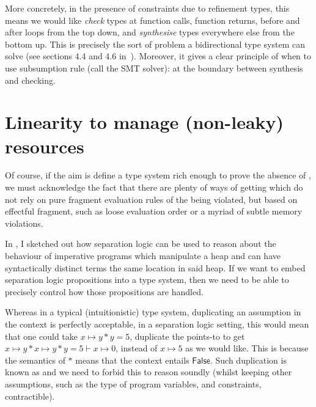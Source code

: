 More concretely, in the presence of constraints due to refinement types, this
means we would like \emph{check} types at function calls, function returns,
before and after loops from the top down, and \emph{synthesise} types
everywhere else from the bottom up. This is precisely the sort of problem a
bidirectional type system can solve (see sections 4.4 and 4.6
in~). Moreover, it gives a clear principle of
when to use subsumption rule (call the SMT solver): at the boundary between
synthesis and checking.

\section{Linearity to manage (non-leaky) resources}

Of course, if the aim is define a type system rich enough to prove the absence
of , we must acknowledge the fact that there are plenty of ways of
getting  which do not rely on pure fragment evaluation rules of the
 being violated, but based on effectful fragment, such as loose
evaluation order or a myriad of subtle memory violations.

In , I sketched out how separation logic can be
used to reason about the behaviour of imperative programs which manipulate a
heap and can have syntactically distinct terms  the same location
in said heap. If we want to embed separation logic propositions into a type
system, then we need to be able to precisely control how those propositions are
handled.

Whereas in a typical (intuitionistic) type system, duplicating an assumption in
the context is perfectly acceptable, in a separation logic setting, this would
mean that one could take $x \mapsto{} y \ast{} y = 5$, duplicate the points-to
to get $x \mapsto{} y \ast{} x \mapsto{} y \ast y = 5 \vdash{} x \mapsto{} 0$,
instead of $x \mapsto{} 5$ as we would like. This is because the semantics of
$\ast{}$ means that the context entails $\mathsf{False}$. Such duplication is
known as  and we need to forbid this to reason soundly
(whilst keeping other assumptions, such as the type of  program
variables, and constraints, contractible).

